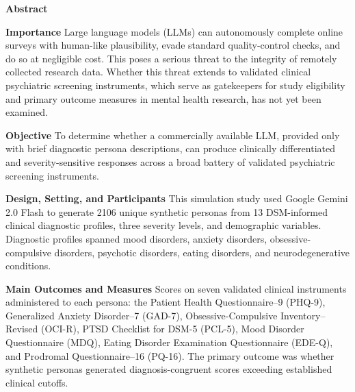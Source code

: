 \documentclass[12pt]{article}
\begin{document}
\newpage

\begin{flushleft}
\textbf{Abstract}

\vspace{0.5em}

\textbf{Importance\hspace{1em}} Large language models (LLMs) can autonomously complete online surveys with human-like plausibility, evade standard quality-control checks, and do so at negligible cost. This poses a serious threat to the integrity of remotely collected research data. Whether this threat extends to validated clinical psychiatric screening instruments, which serve as gatekeepers for study eligibility and primary outcome measures in mental health research, has not yet been examined.

\vspace{0.5em}

\textbf{Objective\hspace{1em}} To determine whether a commercially available LLM, provided only with brief diagnostic persona descriptions, can produce clinically differentiated and severity-sensitive responses across a broad battery of validated psychiatric screening instruments.

\vspace{0.5em}

\textbf{Design, Setting, and Participants\hspace{1em}} This simulation study used Google Gemini 2.0 Flash to generate 2106 unique synthetic personas from 13 DSM-informed clinical diagnostic profiles, three severity levels, and demographic variables. Diagnostic profiles spanned mood disorders, anxiety disorders, obsessive-compulsive disorders, psychotic disorders, eating disorders, and neurodegenerative conditions.

\vspace{0.5em}

\textbf{Main Outcomes and Measures\hspace{1em}} Scores on seven validated clinical instruments administered to each persona: the Patient Health Questionnaire--9 (PHQ-9), Generalized Anxiety Disorder--7 (GAD-7), Obsessive-Compulsive Inventory--Revised (OCI-R), PTSD Checklist for DSM-5 (PCL-5), Mood Disorder Questionnaire (MDQ), Eating Disorder Examination Questionnaire (EDE-Q), and Prodromal Questionnaire--16 (PQ-16). The primary outcome was whether synthetic personas generated diagnosis-congruent scores exceeding established clinical cutoffs.


\end{flushleft}
\end{document}
